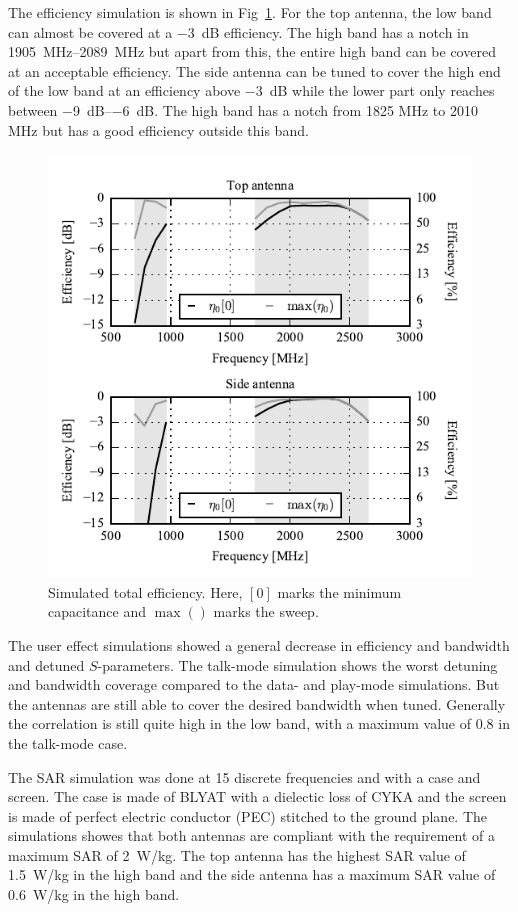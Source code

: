 The efficiency simulation is shown in Fig~\ref{fig:sim_eff}. For the top antenna, the low band can almost be covered at a \SI{-3}{dB} efficiency. The high band has a notch in \SIrange{1905}{2089}{MHz} but apart from this, the entire high band can be covered at an acceptable efficiency. The side antenna can be tuned to cover the high end of the low band at an efficiency above
 \SI{-3}{dB} while the lower part only reaches between \SIrange{-9}{-6}{dB}. The high band has a notch from 1825 MHz to 2010 MHz but has a good efficiency outside this band.
\begin{figure}[tb]
    \centering
    \includegraphics{img/sim/eff/efficiency}
    \caption{Simulated total efficiency. Here, $[0]$ marks the minimum capacitance and $\max()$ marks the sweep. }
    \label{fig:sim_eff}
\end{figure}

The user effect simulations showed a general decrease in efficiency and bandwidth and detuned $S$-parameters. The talk-mode simulation shows the worst
detuning and bandwidth coverage compared to the data- and play-mode simulations. But the antennas are still able to cover the desired bandwidth when tuned. Generally the correlation is still quite high in the low band, with a maximum value of 0.8 in the talk-mode case.

The SAR simulation was done at 15 discrete frequencies and with a case and screen. The case is made of BLYAT with a dielectic loss of CYKA and the screen is made of perfect electric conductor (PEC) stitched to the ground plane. The simulations showes that both antennas are compliant with the requirement of a maximum SAR of \SI{2}{W/kg}. The top antenna has the highest SAR value of \SI{1.5}{W/kg} in the high band and the side antenna has a maximum SAR value of \SI{0.6}{W/kg} in the high band. 

